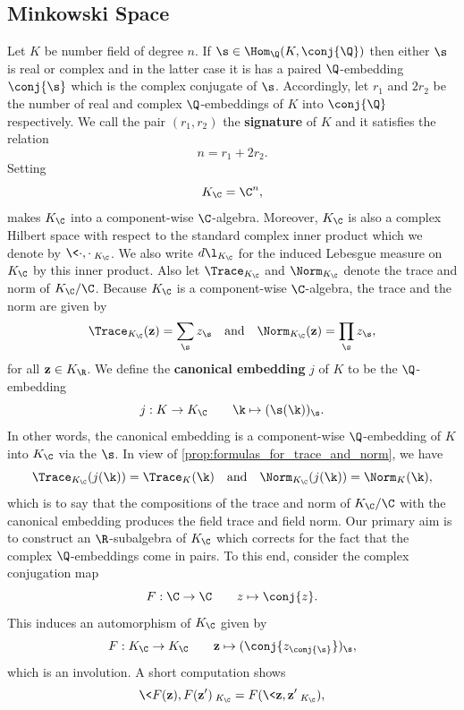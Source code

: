 \documentclass[12pt]{article}
\begin{document}
    \subsection{Minkowski Space}
      Let \(K\) be number field of degree \(n\). If \(\s \in \Hom_{\Q}(K,\conj{\Q})\) then either \(\s\) is real or complex and in the latter case it is has a paired \(\Q\)-embedding \(\conj{\s}\) which is the complex conjugate of \(\s\). Accordingly, let \(r_{1}\) and \(2r_{2}\) be the number of real and complex \(\Q\)-embeddings of \(K\) into \(\conj{\Q}\) respectively. We call the pair \((r_{1},r_{2})\) the \textbf{signature} of \(K\) and it satisfies the relation
      \[
        n = r_{1}+2r_{2}.
      \]
      Setting
      \[
        K_{\C} = \C^{n},
      \]
      makes \(K_{\C}\) into a component-wise \(\C\)-algebra. Moreover, \(K_{\C}\) is also a complex Hilbert space with respect to the standard complex inner product which we denote by \(\<\cdot,\cdot\>_{K_{\C}}\). We also write \(d\l_{K_{\C}}\) for the induced Lebesgue measure on \(K_{\C}\) by this inner product. Also let \(\Trace_{K_{\C}}\) and \(\Norm_{K_{\C}}\) denote the trace and norm of \(K_{\C}/\C\). Because \(K_{\C}\) is a component-wise \(\C\)-algebra, the trace and the norm are given by
      \[
        \Trace_{K_{\C}}(\mathbf{z}) = \sum_{\s}z_{\s} \quad \text{and} \quad \Norm_{K_{\C}}(\mathbf{z}) = \prod_{\s}z_{\s},
      \]
      for all \(\mathbf{z} \in K_{\R}\). We define the \textbf{canonical embedding} \(j\) of \(K\) to be the \(\Q\)-embedding
      \[
        j:K \to K_{\C} \qquad \k \mapsto (\s(\k))_{\s}.
      \]
      In other words, the canonical embedding is a component-wise \(\Q\)-embedding of \(K\) into \(K_{\C}\) via the \(\s\). In view of \cref{prop:formulas_for_trace_and_norm}, we have
      \[
        \Trace_{K_{\C}}(j(\k)) = \Trace_{K}(\k) \quad \text{and} \quad \Norm_{K_{\C}}(j(\k)) = \Norm_{K}(\k),
      \]
      which is to say that the compositions of the trace and norm of \(K_{\C}/\C\) with the canonical embedding produces the field trace and field norm. Our primary aim is to construct an \(\R\)-subalgebra of \(K_{\C}\) which corrects for the fact that the complex \(\Q\)-embeddings come in pairs. To this end, consider the complex conjugation map
      \[
        F:\C \to \C \qquad z \mapsto \conj{z}.
      \]
      This induces an automorphism of \(K_{\C}\) given by
      \[
        F:K_{\C} \to K_{\C} \qquad \mathbf{z} \mapsto (\conj{z_{\conj{\s}}})_{\s},
      \]
      which is an involution. A short computation shows
      \[
        \<F(\mathbf{z}),F(\mathbf{z}')\>_{K_{\C}} = F(\<\mathbf{z},\mathbf{z}'\>_{K_{\C}}),
      \]
\end{document}
